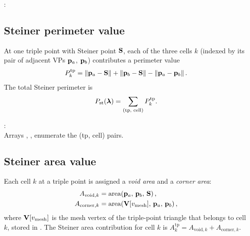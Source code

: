 \documentclass[11pt,a4paper]{article}
\begin{document}
\begin{tcolorbox}[colback=blue!4!white, colframe=blue!40!black,
                  title={Code: Steiner point}, fontupper=\small]
: 
\end{tcolorbox}

\subsection{Steiner perimeter value}
\label{sec:steiner-perim-value}

At one triple point with Steiner point $\mathbf{S}$, each of the three cells $k$
(indexed by its pair of adjacent VPs $\mathbf{p}_{a}$, $\mathbf{p}_{b}$) contributes a
perimeter value
\begin{equation}
  P_k^{\mathrm{tp}}
    = \left\|\mathbf{p}_{a} - \mathbf{S}\right\| + \left\|\mathbf{p}_{b} - \mathbf{S}\right\| - \left\|\mathbf{p}_{a} - \mathbf{p}_{b}\right\|.
  \label{eq:steiner-perim-per-cell}
\end{equation}
The total Steiner perimeter is
\begin{equation}
  P_{\mathrm{st}}(\boldsymbol{\lambda})
    = \sum_{\text{(tp, cell)}} P_k^{\mathrm{tp}}.
  \label{eq:steiner-perim}
\end{equation}

\begin{tcolorbox}[colback=blue!4!white, colframe=blue!40!black,
                  title={Code: Steiner perimeter value}, fontupper=\small]
: \\[2pt]
Arrays , ,
 enumerate the (tp, cell) pairs.
\end{tcolorbox}

\subsection{Steiner area value}
\label{sec:steiner-area-value}

Each cell $k$ at a triple point is assigned a \emph{void area} and a
\emph{corner area}:
\begin{align}
  A_{\mathrm{void},k}   &= \mathrm{area}\!\left(\mathbf{p}_{a},\, \mathbf{p}_{b},\, \mathbf{S}\right),
  \label{eq:steiner-void-area} \\
  A_{\mathrm{corner},k} &= \mathrm{area}\!\left(\mathbf{V}[v_\mathrm{mesh}],\,
                                                 \mathbf{p}_{a},\, \mathbf{p}_{b}\right),
  \label{eq:steiner-corner-area}
\end{align}
where $\mathbf{V}[v_\mathrm{mesh}]$ is the mesh vertex of the triple-point triangle
that belongs to cell $k$, stored in .
The Steiner area contribution for cell $k$ is
$A_k^{\mathrm{tp}} = A_{\mathrm{void},k} + A_{\mathrm{corner},k}$.
\end{document}
